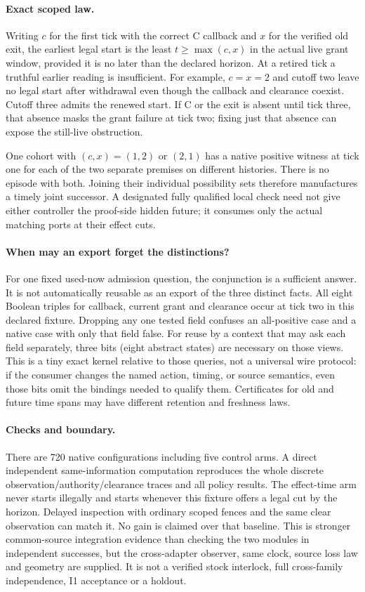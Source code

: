 \documentclass{article}
\begin{document}
\paragraph{Exact scoped law.}
Writing \(c\) for the first tick with the correct C callback
and \(x\) for the verified old exit, the earliest legal start is
the least \(t\ge\max(c,x)\) in the actual live grant window,
provided it is no later than the declared horizon. At a
retired tick a truthful earlier reading is insufficient. For
example, \(c=x=2\) and cutoff two leave no legal start after
withdrawal even though the callback and clearance coexist.
Cutoff three admits the renewed start. If C or the exit is absent
until tick three, that absence masks the grant failure at tick two;
fixing just that absence can expose the still-live obstruction.

One cohort with \((c,x)=(1,2)\) or \((2,1)\) has a native
positive witness at tick one for each of the two separate
premises on different histories. There is no episode
with both. Joining their individual possibility sets therefore
manufactures a timely joint successor. A designated fully
qualified local check need not give either controller the
proof-side hidden future; it consumes only the actual matching
ports at their effect cuts.

\paragraph{When may an export forget the distinctions?}
For one fixed used-now admission question, the conjunction is
a sufficient answer. It is not automatically reusable as an
export of the three distinct facts. All eight Boolean triples
for callback, current grant and clearance occur at tick two
in this declared fixture. Dropping any one tested field confuses
an all-positive case and a native case with only that field false.
For reuse by a context that may ask each field separately,
three bits (eight abstract states) are necessary on those views.
This is a tiny exact kernel relative to those queries, not a
universal wire protocol: if the consumer changes the named
action, timing, or source semantics, even those bits omit the
bindings needed to qualify them. Certificates for old and future
time spans may have different retention and freshness laws.

\paragraph{Checks and boundary.}
There are 720 native configurations including five control arms.
A direct independent same-information computation reproduces
the whole discrete observation/authority/clearance traces and
all policy results. The effect-time arm never starts illegally
and starts whenever this fixture offers a legal cut by the
horizon. Delayed inspection with ordinary scoped fences and
the same clear observation can match it. No gain is claimed
over that baseline. This is stronger common-source integration
evidence than checking the two modules in independent successes,
but the cross-adapter observer, same clock, source loss law
and geometry are supplied. It is not a verified stock interlock,
full cross-family independence, I1 acceptance or a holdout.
\end{document}
